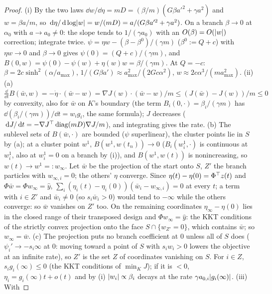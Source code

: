 \begin{proof}
(i) By the two laws $\dd w/\dd\eta = mD = (\beta/m)(G\beta a'^2 + \gamma a^2)$ and $w = \beta a/m$, so
$\,\mathrm{d}\eta/\,\mathrm{d}\log\lvert w\rvert = w/(mD) = a/(G\beta a'^2 + \gamma a^2)$. On a branch $\beta\to0$ at $\alpha_0$ with
$a\to a_0\ne0$: the slope tends to $1/(\gamma a_0)$ with an $O(\beta) = O(\lvert w\rvert)$ correction; integrate twice.
$\psi = \eta w - (\beta - \beta^0)/(\gamma m)$ ($\beta^0 := Q + c$) with $\eta w\to0$ and $\beta\to0$ gives
$\psi(0) = (Q + c)/(\gamma m)$, and $B(0,w) = \psi(0) - \psi(w) + \eta(w)w = \beta/(\gamma m)$. At $Q = -c$:
$\beta = 2c\sinh^2(\alpha/a_{\max})$, $1/(G\beta a')\approx a_{\max}^2/(2Gc\alpha^2)$,
$w\approx2c\alpha^3/(ma_{\max}^2)$. (ii)(a)
$\frac{\dd}{\dd t}B(\bar w,w) = -\dot\eta\cdot(\bar w - w) = \nabla J(w)\cdot(\bar w - w)/m\le(J(\bar w) - J(w))/m\le0$
by convexity, also for $\bar w$ on $K$'s boundary (the term $B_i(0,\cdot) = \beta_i/(\gamma m)$ has
$\dd(\beta_i/(\gamma m))/\dd t = w_ig_i$, the same formula); $J$ decreases
($\,\mathrm{d} J/\,\mathrm{d} t = -\nabla J^\top\operatorname{diag}(mD)\nabla J/m$), and integrating gives the rate. (b) The sublevel sets
of $B(\bar w,\cdot)$ are bounded ($\psi$ superlinear), the cluster points lie in $S$ by (a); at a cluster point $w^1$,
$B(w^1,w(t_n))\to0$ ($B_i(w^1_i,\cdot)$ is continuous at $w^1_i$, also at $w^1_i = 0$ on a branch by (i)), and
$B(w^1,w(t))$ is nonincreasing, so $w(t)\to w^1 =: w_\infty$. Let $\bar w$ be the projection of the start onto $S$, $Z'$
the branch particles with $w_{\infty,i} = 0$; the others' $\eta$ converge. Since $\eta(t) - \eta(0) = \Phi^\top z(t)$ and
$\Phi\bar w = \Phi w_\infty = \hat y$, $\sum_i(\eta_i(t) - \eta_i(0))(\bar w_i - w_{\infty,i}) = 0$ at every $t$; a
term with $i\in Z'$ and $\bar w_i\ne0$ (so $s_i\bar w_i > 0$) would tend to $-\infty$ while the others converge: so
$\bar w$ vanishes on $Z'$ too. On the remaining coordinates $\eta_\infty - \eta(0)$ lies in the closed range of their
transposed design and $\Phi w_\infty = \hat y$: the KKT conditions of the strictly convex projection onto the face
$S\cap\{w_{Z'} = 0\}$, which contains $\bar w$; so $w_\infty = \bar w$. (c) The projection puts no branch coefficient at
0 unless all of $S$ does ($\psi_i'\to-s_i\infty$ at 0: moving toward a point of $S$ with $s_iw_i > 0$ lowers the
objective at an infinite rate), so $Z'$ is the set $Z$ of coordinates vanishing on $S$. For $i\in Z$,
$s_ig_i(\infty)\le0$ (the KKT conditions of $\min_KJ$); if it is $< 0$, $\eta_i = g_i(\infty)t + o(t)$ and by (i)
$\lvert w_i\rvert\propto\beta_i$ decays at the rate $\gamma a_{0,i}\lvert g_i(\infty)\rvert$. (iii) With

\end{proof}
